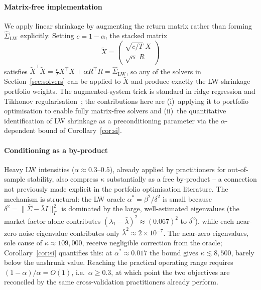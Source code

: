 \paragraph{Matrix-free implementation}
We apply linear shrinkage by augmenting the return matrix rather than forming
$\hat\Sigma_{\text{LW}}$ explicitly. Setting $c = 1-\alpha$, the stacked matrix
\[
  \tilde{X} = \begin{pmatrix} \sqrt{c/T}\;X \\ \sqrt{\alpha}\;R \end{pmatrix}
\]
satisfies $\tilde{X}^\top\tilde{X} = \frac{c}{T}X^\top X + \alpha R^\top R
= \hat\Sigma_{\text{LW}}$, so any of the solvers in Section~\ref{sec:solvers} can be
applied to $\tilde{X}$ and produce exactly the LW-shrinkage portfolio weights.
The augmented-system trick is standard in ridge regression and Tikhonov
regularisation~\cite{golub2013}; the contributions here are (i)~applying it to
portfolio optimisation to enable fully matrix-free solvers and (ii)~the
quantitative identification of LW shrinkage as a preconditioning parameter
via the $\alpha$-dependent bound of Corollary~\ref{cor:si}.

\paragraph{Conditioning as a by-product}
Heavy LW intensities ($\alpha \approx 0.3$--$0.5$), already applied by practitioners
for out-of-sample stability, also compress $\kappa$ substantially as a free by-product
-- a connection not previously made explicit in the portfolio optimisation literature.
The mechanism is structural: the LW oracle $\alpha^* = \beta^2/\delta^2$ is small
because $\delta^2 = \|\hat\Sigma - \bar\lambda I\|_F^2$ is dominated by the large,
well-estimated eigenvalues (the market factor alone contributes
$(\lambda_1 - \bar\lambda)^2 \approx (0.067)^2$ to $\delta^2$), while each near-zero
noise eigenvalue contributes only $\bar\lambda^2 \approx 2\times10^{-7}$.
The near-zero eigenvalues, sole cause of $\kappa \approx 109{,}000$, receive
negligible correction from the oracle; Corollary~\ref{cor:si} quantifies this: at
$\alpha^* \approx 0.017$ the bound gives $\kappa \lesssim 8{,}500$, barely below the
unshrunk value. Reaching the practical operating range requires $(1-\alpha)/\alpha =
O(1)$, i.e.\ $\alpha \geq 0.3$, at which point the two objectives are reconciled by
the same cross-validation practitioners already perform.

